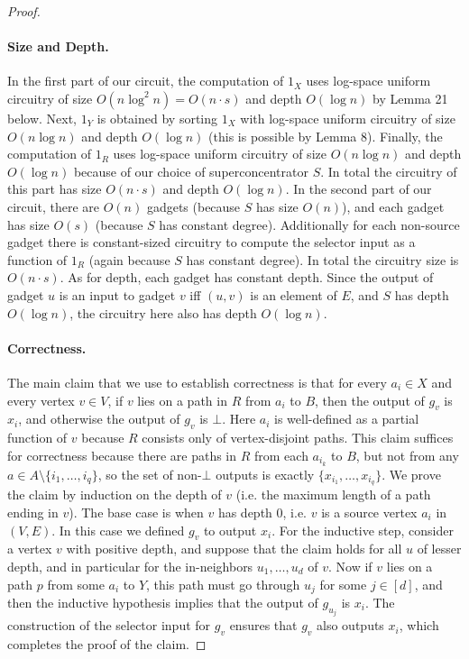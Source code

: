 \documentclass[10pt,a4paper]{article}
\begin{document}
\begin{proof}
\paragraph{Size and Depth.} In the first part of our circuit, the computation of $1_X$ uses log-space uniform circuitry of size $O(n\log^2n)=O(n\cdot s)$ and depth $O(\log n)$ by Lemma 21 below. Next, $1_Y$ is obtained by sorting $1_X$ with log-space uniform circuitry of size $O(n\log n)$ and depth $O(\log n)$ (this is possible by Lemma 8). Finally, the computation of $1_R$ uses log-space uniform circuitry of size $O(n\log n)$ and depth $O(\log n)$ because of our choice of superconcentrator $S$. In total the circuitry of this part has size $O(n\cdot s)$ and depth $O(\log n)$.
In the second part of our circuit, there are $O(n)$ gadgets (because $S$ has size $O(n)$), and each gadget has size $O(s)$ (because $S$ has constant degree). Additionally for each non-source gadget there is constant-sized circuitry to compute the selector input as a function of $1_R$ (again because $S$ has constant degree). In total the circuitry size is $O(n\cdot s)$. As for depth, each gadget has constant depth. Since the output of gadget $u$ is an input to gadget $v$ iff $(u,v)$ is an element of $E$, and $S$ has depth $O(\log n)$, the circuitry here also has depth $O(\log n)$.
\paragraph{Correctness.} The main claim that we use to establish correctness is that for every $a_i\in X$ and every vertex $v\in V$, if $v$ lies on a path in $R$ from $a_i$ to $B$, then the output of $g_v$ is $x_i$, and otherwise the output of $g_v$ is $\bot$. Here $a_i$ is well-defined as a partial function of $v$ because $R$ consists only of vertex-disjoint paths. This claim suffices for correctness because there are paths in $R$ from each $a_{i_k}$ to $B$, but not from any $a\in A\setminus\{i_1,\ldots,i_q\}$, so the set of non-$\bot$ outputs is exactly $\{x_{i_1},\ldots,x_{i_q}\}$.
We prove the claim by induction on the depth of $v$ (i.e. the maximum length of a path ending in $v$). The base case is when $v$ has depth 0, i.e. $v$ is a source vertex $a_i$ in $(V,E)$. In this case we defined $g_v$ to output $x_i$.
For the inductive step, consider a vertex $v$ with positive depth, and suppose that the claim holds for all $u$ of lesser depth, and in particular for the in-neighbors $u_1,\ldots,u_d$ of $v$. Now if $v$ lies on a path $p$ from some $a_i$ to $Y$, this path must go through $u_j$ for some $j\in[d]$, and then the inductive hypothesis implies that the output of $g_{u_j}$ is $x_i$. The construction of the selector input for $g_v$ ensures that $g_v$ also outputs $x_i$, which completes the proof of the claim.
\end{proof}
\end{document}
